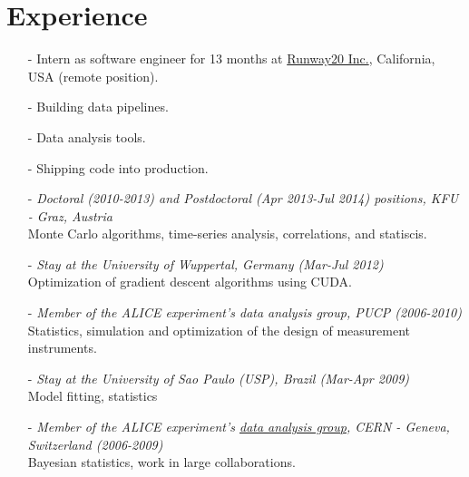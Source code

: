 \documentclass[a4paper, 10pt]{article}
\begin{document}
\vspace*{2mm}
\section{Experience}
\vspace*{2mm}
\vspace*{-1mm}
\begin{itemize}
    \item[-] Intern as software engineer for 13 months at \href{http://www.weldai.com/}{Runway20 Inc.}, California, USA (remote position).\vspace*{-2mm}
    \item[-] Building data pipelines.\vspace*{-2mm}
    \item[-] Data analysis tools.\vspace*{-2mm}
    \item[-] Shipping code into production.\vspace*{-2mm}
\end{itemize}

\vspace*{2mm}
\vspace*{-1mm}
\begin{itemize}
    \item[-] {\it Doctoral (2010-2013) and Postdoctoral (Apr 2013-Jul 2014) positions, KFU - Graz, Austria}
              \\Monte Carlo algorithms, time-series analysis, correlations, and statiscis.\vspace*{-1mm}
    \item[-] {\it Stay at the University of Wuppertal, Germany (Mar-Jul 2012)}
              \\Optimization of gradient descent algorithms using CUDA.\vspace*{-1mm}
    \item[-] {\it Member of the ALICE experiment's data analysis group,  PUCP (2006-2010)}
              \\Statistics, simulation and optimization of the design of measurement instruments.
    \item[-] {\it Stay at the University of Sao Paulo (USP), Brazil (Mar-Apr 2009)}
              \\Model fitting, statistics\vspace*{-1mm}
    \item[-] {\it Member of the ALICE experiment's \href{http://aliweb.cern.ch/Offline/}{data analysis group}, CERN - 
              Geneva, Switzerland (2006-2009)}
              \\Bayesian statistics, work in large collaborations.
\end{itemize}
\end{document}
